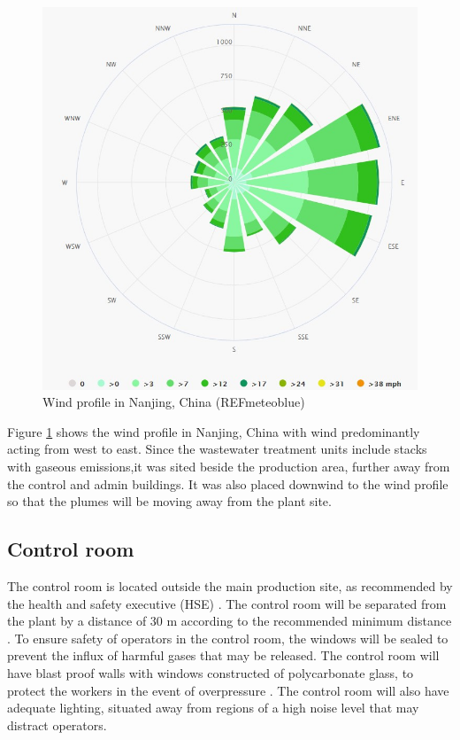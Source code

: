 \begin{figure}
\centering
\includegraphics[width=\linewidth]{chapters/5-safety-layout-environment/figures/Windrose_profile.jpg}
\caption{Wind profile in Nanjing, China (REFmeteoblue)}
\label{fig:wind}
\end{figure}


Figure \ref{fig:wind} shows the wind profile in Nanjing, China with wind predominantly acting from west to east. Since the wastewater treatment units include stacks with gaseous emissions,it was sited beside the production area, further away from the control and admin buildings. It was also placed downwind to the wind profile so that the plumes will be moving away from the plant site. 

\subsection{Control room}

The control room is located outside the main production site, as recommended by the health and safety executive (HSE) \cite{health_and_safety_executive_control_nodate}. The control room will be separated from the plant by a distance of 30 m according to the recommended minimum distance \cite{mannan_lees_2012}. To ensure safety of operators in the control room, the windows will be sealed to prevent the influx of harmful gases that may be released. The control room will have blast proof walls with windows constructed of polycarbonate glass, to protect the workers in the event of overpressure \cite{health_and_safety_executive_control_nodate}. The control room will also have adequate lighting, situated away from regions of a high noise level that may distract operators.

